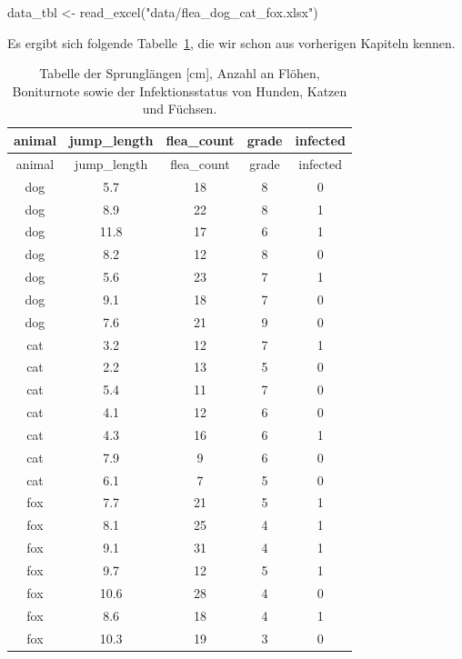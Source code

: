 \documentclass[
  letterpaper,
  DIV=11,
  oneside]{scrreport}
\newenvironment{Shaded}{\begin{snugshade}}{\end{snugshade}}
\newcommand{\FunctionTok}[1]{\textcolor[rgb]{0.28,0.35,0.67}{#1}}
\newcommand{\NormalTok}[1]{\textcolor[rgb]{0.00,0.23,0.31}{#1}}
\newcommand{\OtherTok}[1]{\textcolor[rgb]{0.00,0.23,0.31}{#1}}
\newcommand{\StringTok}[1]{\textcolor[rgb]{0.13,0.47,0.30}{#1}}
\begin{document}
\begin{Shaded}
\begin{Highlighting}[]
\NormalTok{data\_tbl }\OtherTok{\textless{}{-}} \FunctionTok{read\_excel}\NormalTok{(}\StringTok{"data/flea\_dog\_cat\_fox.xlsx"}\NormalTok{)}
\end{Highlighting}
\end{Shaded}

Es ergibt sich folgende Tabelle~\ref{tbl-dog-cat-dplyr}, die wir schon
aus vorherigen Kapiteln kennen.

\hypertarget{tbl-dog-cat-dplyr}{}
\begin{longtable}[]{@{}ccccc@{}}
\caption{\label{tbl-dog-cat-dplyr}Tabelle der Sprunglängen {[}cm{]},
Anzahl an Flöhen, Boniturnote sowie der Infektionsstatus von Hunden,
Katzen und Füchsen.}\tabularnewline
\toprule()
animal & jump\_length & flea\_count & grade & infected \\
\midrule()
\endfirsthead
\toprule()
animal & jump\_length & flea\_count & grade & infected \\
\midrule()
\endhead
dog & 5.7 & 18 & 8 & 0 \\
dog & 8.9 & 22 & 8 & 1 \\
dog & 11.8 & 17 & 6 & 1 \\
dog & 8.2 & 12 & 8 & 0 \\
dog & 5.6 & 23 & 7 & 1 \\
dog & 9.1 & 18 & 7 & 0 \\
dog & 7.6 & 21 & 9 & 0 \\
cat & 3.2 & 12 & 7 & 1 \\
cat & 2.2 & 13 & 5 & 0 \\
cat & 5.4 & 11 & 7 & 0 \\
cat & 4.1 & 12 & 6 & 0 \\
cat & 4.3 & 16 & 6 & 1 \\
cat & 7.9 & 9 & 6 & 0 \\
cat & 6.1 & 7 & 5 & 0 \\
fox & 7.7 & 21 & 5 & 1 \\
fox & 8.1 & 25 & 4 & 1 \\
fox & 9.1 & 31 & 4 & 1 \\
fox & 9.7 & 12 & 5 & 1 \\
fox & 10.6 & 28 & 4 & 0 \\
fox & 8.6 & 18 & 4 & 1 \\
fox & 10.3 & 19 & 3 & 0 \\
\bottomrule()
\end{longtable}
\end{document}
